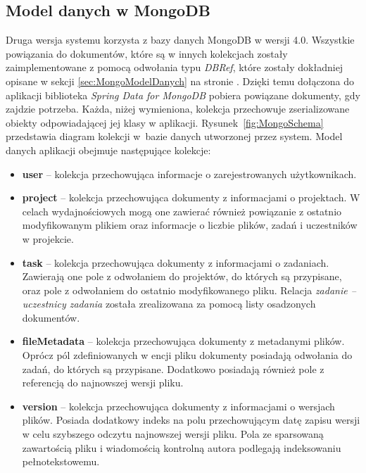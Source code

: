 \subsection{Model danych w MongoDB}

Druga wersja systemu korzysta z bazy danych MongoDB w wersji 4.0.
Wszystkie powiązania do dokumentów, które są w innych kolekcjach zostały zaimplementowane z pomocą odwołania typu \textit{DBRef}, które zostały dokładniej opisane w sekcji \ref{sec:MongoModelDanych} na stronie \pageref{sec:MongoModelDanych}.
Dzięki temu dołączona do aplikacji biblioteka \textit{Spring Data for MongoDB} pobiera powiązane dokumenty, gdy zajdzie potrzeba. 
Każda, niżej wymieniona, kolekcja przechowuje zserializowane obiekty odpowiadającej jej klasy w aplikacji.
Rysunek~\ref{fig:MongoSchema} przedstawia diagram kolekcji w~bazie danych utworzonej przez system.
Model danych aplikacji obejmuje następujące kolekcje:
\begin{itemize}
    \item \textbf{user} -- kolekcja przechowująca informacje o zarejestrowanych użytkownikach.

    \item \textbf{project} -- kolekcja przechowująca dokumenty z informacjami o projektach.
    W celach wydajnościowych mogą one zawierać również powiązanie z ostatnio modyfikowanym plikiem oraz informacje o liczbie plików, zadań i uczestników w projekcie.
    
    \item \textbf{task} -- kolekcja przechowująca dokumenty z informacjami o zadaniach.
    Zawierają one pole z odwołaniem do projektów, do których są przypisane, oraz pole z odwołaniem do ostatnio modyfikowanego pliku.
    Relacja \textit{zadanie -- uczestnicy zadania} została zrealizowana za pomocą listy osadzonych dokumentów.
    
    \item \textbf{fileMetadata} -- kolekcja przechowująca dokumenty z metadanymi plików.
    Oprócz pól zdefiniowanych w encji pliku dokumenty posiadają odwołania do zadań, do których są przypisane.
    Dodatkowo posiadają również pole z referencją do najnowszej wersji pliku.
    
    \item \textbf{version} -- kolekcja przechowująca dokumenty z informacjami o wersjach plików.
    Posiada dodatkowy indeks na polu przechowującym datę zapisu wersji w celu szybszego odczytu najnowszej wersji pliku.
    Pola ze sparsowaną zawartością pliku i wiadomością kontrolną autora podlegają indeksowaniu pełnotekstowemu.
\end{itemize}

